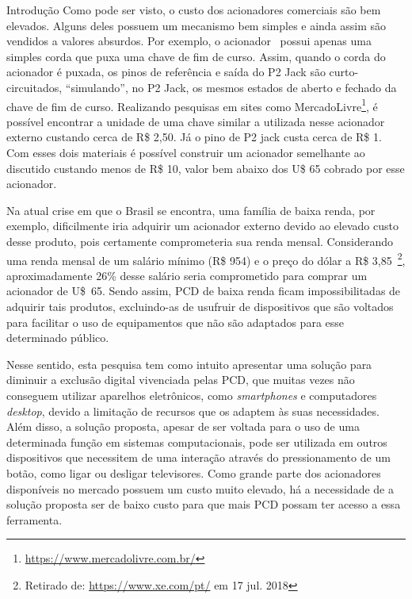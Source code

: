 \begin{chapter}{Introdução}
Como pode ser visto, o custo dos acionadores comerciais são bem elevados. Alguns
deles possuem um mecanismo bem simples e ainda assim são vendidos a valores
absurdos. Por exemplo, o acionador~\cite{StringSwitch} possui apenas uma simples
corda que puxa uma chave de fim de curso. Assim, quando o corda do acionador é
puxada, os pinos de referência e saída do P2 Jack são curto-circuitados,
``simulando'', no P2 Jack, os mesmos estados de aberto e fechado da chave de fim
de curso. Realizando pesquisas em sites como
MercadoLivre\footnote{\url{https://www.mercadolivre.com.br/}}, é possível
encontrar a unidade de uma chave similar a utilizada nesse acionador externo
custando cerca de R\$ 2,50. Já o pino de P2 jack custa cerca de R\$ 1. Com esses
dois materiais é possível construir um acionador semelhante ao discutido
custando menos de R\$ 10, valor bem abaixo dos U\$ 65 cobrado por esse
acionador. %

Na atual crise em que o Brasil se encontra, uma família de baixa renda, por
exemplo, dificilmente iria adquirir um acionador externo devido ao elevado custo
desse produto, pois certamente comprometeria sua renda mensal.  Considerando uma
renda mensal de um salário mínimo  (R\$ 954) e o preço do dólar a R\$
3,85~\footnote{Retirado de: \url{https://www.xe.com/pt/} em 17 jul. 2018},
aproximadamente 26\% desse salário seria comprometido para comprar um acionador
de U\$~65. Sendo assim, PCD de baixa renda ficam impossibilitadas de adquirir
tais produtos, excluindo-as de usufruir de dispositivos que são voltados para
facilitar o uso de equipamentos que não são adaptados para esse determinado
público. %

Nesse sentido, esta pesquisa tem como intuito apresentar uma solução para
diminuir a exclusão digital vivenciada pelas PCD, que muitas vezes não conseguem
utilizar aparelhos eletrônicos, como \textit{smartphones} e computadores
\textit{desktop}, devido a limitação de recursos que os adaptem às suas
necessidades. Além disso, a solução proposta, apesar de ser voltada para o uso de
uma determinada função em sistemas computacionais, pode ser utilizada em outros
dispositivos que necessitem de uma interação através do pressionamento de um
botão, como ligar ou desligar televisores. Como grande parte dos acionadores
disponíveis no mercado possuem um custo muito elevado, há a necessidade de a
solução proposta ser de baixo custo para que mais PCD possam ter
acesso a essa ferramenta. 

 

\end{chapter}
